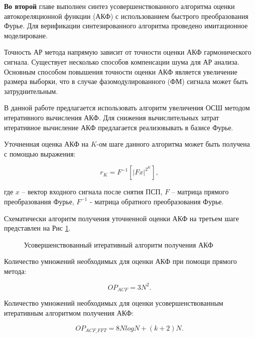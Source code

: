 {\bf{Во второй}} главе выполнен синтез усовершенствованного алгоритма оценки автокореляционной функции (АКФ) с использованием
быстрого преобразования Фурье. Для верификации синтезированного алгоритма проведено имитационное моделироване.

Точность АР метода напрямую зависит от точности оценки АКФ гармонического сигнала.
Существует несколько способов компенсации шума для АР анализа.
Основным способом повышения точности оценки АКФ является увеличение размера выборки, что в случае фазомодулированного (ФМ) сигнала может быть затруднительным. 

В данной работе предлагается использовать алгоритм увеличения ОСШ методом итеративного вычисления АКФ.
Для снижения вычислительных затрат итеративное вычисление АКФ предлагается реализовывать в базисе Фурье. 

Уточненная оценка АКФ на ${K}$-ом шаге данного алгоритма может быть получена с помощью выражения:
\begin{center}
\begin{equation}
	\label{eq:akf_3}
	\hat{r}_K = F^{-1}\left[ \left| Fx \right| ^{2^K} \right],
\end{equation}
\end{center}
где ${x}$ – вектор входного сигнала после снятия ПСП, ${F}$ – матрица прямого преобразования Фурье,
${F^{-1}}$ - матрица обратного преобразования Фурье.

Схематически алгоритм получения уточненной оценки АКФ на третьем шаге представлен на Рис \ref{pic:akf_pic}.
\begin{figure}[h]
	\center{}
	\caption{Усовершенствованный итеративный алгоритм получения АКФ}
	\label{pic:akf_pic}
\end{figure}

Количество умножений необходимых для оценки АКФ при помощи прямого метода:
\begin{center}
\begin{equation}
	OP_{ACF} = 3N^2.
\end{equation}
\end{center}

Количество умножений необходимых для оценки усовершенствованным итеративным алгоритмом получения АКФ: \begin{center}
\begin{equation}
	OP_{ACF\_FFT} = 8NlogN + (k+2)N.
\end{equation}
\end{center}

